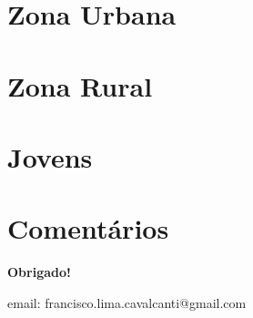 \documentclass[8pt]{beamer}
\begin{document}
\section{Zona Urbana}


\begin{frame}[label=amzurbanacod2dig]{}
\textit{\hyperlink{indice_principal}{}}

\end{frame}

\begin{frame}[label=amzurbanacnae2dig]{}
\textit{\hyperlink{indice_principal}{}}

\end{frame}

\section{Zona Rural}


\begin{frame}[label=amzruralcod2dig]{}
\textit{\hyperlink{indice_principal}{}}

\end{frame}

\begin{frame}[label=amzruralcnae2dig]{}
\textit{\hyperlink{indice_principal}{}}

\end{frame}

\section{Jovens}


\begin{frame}[label=amzjovemcod2dig]{}
\textit{\hyperlink{indice_principal}{}}

\end{frame}

\begin{frame}[label=amzjovemcnae2dig]{}
\textit{\hyperlink{indice_principal}{}}

\end{frame}


\section{Comentários}

\frame
{
\begin{center}
	\vfill
	\textbf{Obrigado!}
	\\

	\begin{small}
	email: francisco.lima.cavalcanti@gmail.com
	\end{small}
	\vfill     
\end{center}
}
\end{document}

